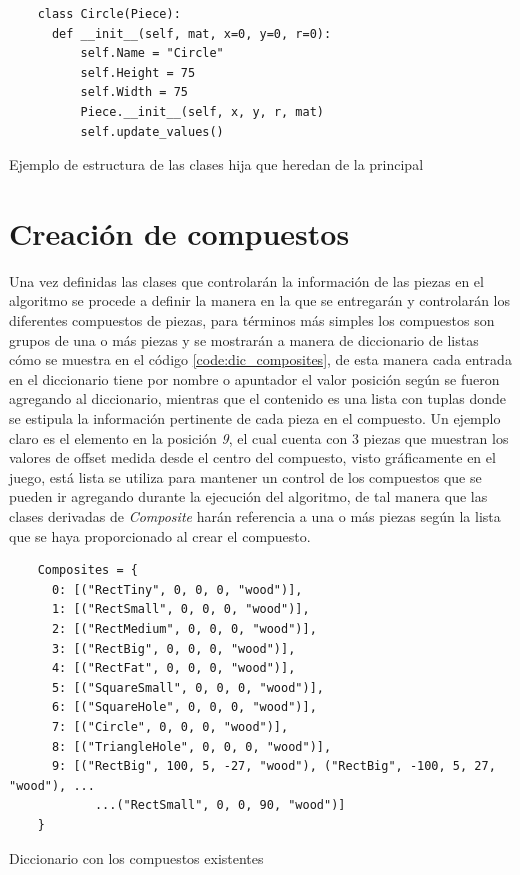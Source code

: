 \begin{listing}[ht]
  \begin{verbatim}
    class Circle(Piece):
      def __init__(self, mat, x=0, y=0, r=0):
          self.Name = "Circle"
          self.Height = 75
          self.Width = 75
          Piece.__init__(self, x, y, r, mat)
          self.update_values()
  \end{verbatim}
  \caption{Ejemplo de estructura de las clases hija que heredan de la principal}
  \label{code:dic_individual_piece_class}
\end{listing}

\section{Creación de compuestos}
\label{section:composite_creation}

Una vez definidas las clases que controlarán la información de las
piezas en el algoritmo se procede a definir la manera en la que se entregarán y
controlarán los diferentes compuestos de piezas, para términos más simples los
compuestos son grupos de una o más piezas y se mostrarán a manera de diccionario
de listas cómo se muestra en el código \ref{code:dic_composites}, de esta manera
cada entrada en el diccionario tiene por nombre o apuntador el valor posición
según se fueron agregando al diccionario, mientras que el contenido es una lista
con tuplas donde se estipula la información pertinente de cada pieza en el
compuesto. Un ejemplo claro es el elemento en la posición \textit{9}, el cual
cuenta con 3 piezas que muestran los valores de offset medida desde el centro
del compuesto, visto gráficamente en el juego, está lista se utiliza para
mantener un control de los compuestos que se pueden ir agregando durante la
ejecución del algoritmo, de tal manera que las clases derivadas de
\textit{Composite} harán referencia a una o más piezas según la lista que se
haya proporcionado al crear el compuesto.

\begin{listing}[ht]
  \begin{verbatim}
    Composites = {
      0: [("RectTiny", 0, 0, 0, "wood")],
      1: [("RectSmall", 0, 0, 0, "wood")],
      2: [("RectMedium", 0, 0, 0, "wood")],
      3: [("RectBig", 0, 0, 0, "wood")],
      4: [("RectFat", 0, 0, 0, "wood")],
      5: [("SquareSmall", 0, 0, 0, "wood")],
      6: [("SquareHole", 0, 0, 0, "wood")],
      7: [("Circle", 0, 0, 0, "wood")],
      8: [("TriangleHole", 0, 0, 0, "wood")],
      9: [("RectBig", 100, 5, -27, "wood"), ("RectBig", -100, 5, 27, "wood"), ...
            ...("RectSmall", 0, 0, 90, "wood")]
    } 
  \end{verbatim}
  \caption{Diccionario con los compuestos existentes}
  \label{code:dic_composites}
\end{listing}

